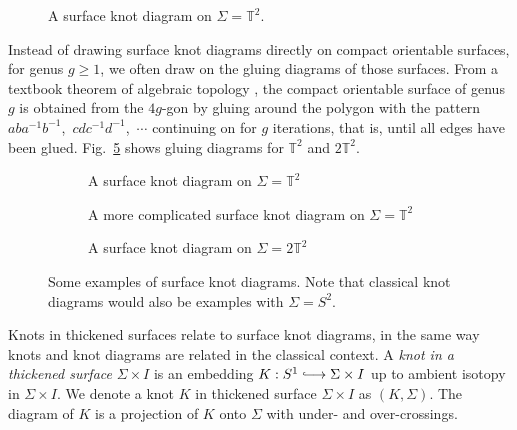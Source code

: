 \documentclass[12pt]{report}
\newcommand{\T}{\mathbb{T}}
\newcommand{\inject}{\lhook\joinrel\longrightarrow}
\theoremstyle{upright}
\begin{document}
\begin{figure}[hbt!]
	\centering
	\def\svgscale{0.6}
	
	
	\caption{A surface knot diagram on $\Sigma = \T^{2}$.}
	\label{fig:surface-knot-diagram-example}
\end{figure}

Instead of drawing surface knot diagrams directly on compact orientable surfaces, for genus $g \geq 1$, we often draw on the gluing diagrams of those surfaces. From a textbook theorem of algebraic topology \parencite[Chapter 0]{algebraic-topology}, the compact orientable surface of genus $g$ is obtained from the $4g$-gon by gluing around the polygon with the pattern $aba^{-1}b^{-1}$,~$cdc^{-1}d^{-1}$,~$\cdots$ continuing on for $g$ iterations, that is, until all edges have been glued. Fig.~\ref{fig:surface-knot-diagram-examples} shows gluing diagrams for $\T^{2}$ and $2\T^{2}$.
\begin{figure}[hbt!]
	\centering
	\hspace*{\fill}
	\begin{subfigure}[b]{0.3 \textwidth}
		\centering
		\def\svgscale{0.26}
		
		\caption{A surface knot diagram on $\Sigma = \T^{2}$}
		\label{fig:torus-unknot}
	\end{subfigure}
	\hspace*{\fill}
	\begin{subfigure}[b]{0.3 \textwidth}
		\centering
		\def\svgscale{0.26}
		
		\caption{A more complicated surface knot diagram on $\Sigma = \T^{2}$}
		\label{fig:torus-vknot}
	\end{subfigure}
	\hspace*{\fill}
	\begin{subfigure}[b]{0.3 \textwidth}
		\centering
		\def\svgscale{0.24}
		
		\caption{A surface knot diagram on $\Sigma = 2\T^{2}$}
		\label{fig:2torus-vknot}
	\end{subfigure}
	\caption{Some examples of surface knot diagrams. Note that classical knot diagrams would also be examples with $\Sigma = S^{2}$.}
	\label{fig:surface-knot-diagram-examples}
	\hspace*{\fill} 
\end{figure}

Knots in thickened surfaces relate to surface knot diagrams, in the same way knots and knot diagrams are related in the classical context. A \textit{knot in a thickened surface} $\Sigma \times I$ is an embedding $K:S^{1} \inject \Sigma \times I$ up to ambient isotopy in $\Sigma \times I$. We denote a knot $K$ in thickened surface $\Sigma \times I$ as $(K, \Sigma)$. The diagram of $K$ is a projection of $K$ onto $\Sigma$ with under- and over-crossings.
\end{document}
